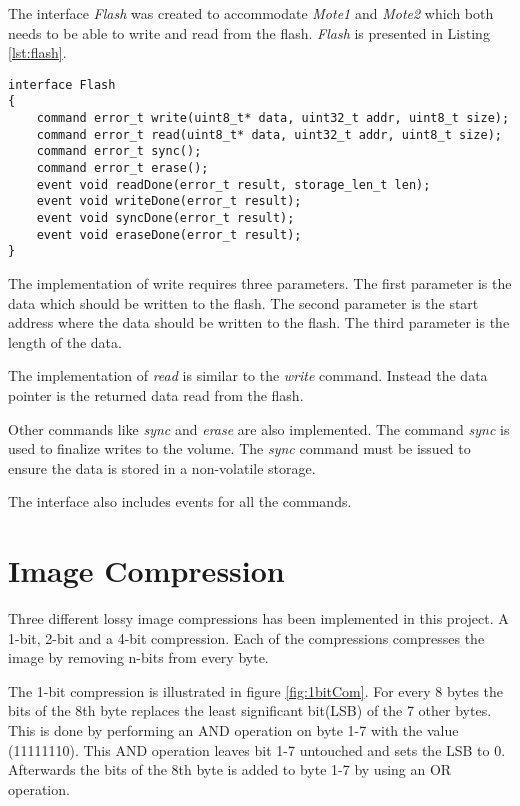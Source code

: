 The interface \emph{Flash} was created to accommodate \emph{Mote1} and \emph{Mote2} which both needs to be able to write and read from the flash. \emph{Flash} is presented in Listing \ref{lst:flash}.

\begin{lstlisting}[caption={The interface flash}, label=lst:flash]
interface Flash
{
	command error_t write(uint8_t* data, uint32_t addr, uint8_t size);
	command error_t read(uint8_t* data, uint32_t addr, uint8_t size);
	command error_t sync();
	command error_t erase();
	event void readDone(error_t result, storage_len_t len);
	event void writeDone(error_t result);
	event void syncDone(error_t result);
	event void eraseDone(error_t result);	
}
\end{lstlisting}

The implementation of write requires three parameters. The first parameter is the data which should be written to the flash. The second parameter is the start address where the data should be written to the flash. The third parameter is the length of the data. 

The implementation of \emph{read} is similar to the \emph{write} command. Instead the data pointer is the returned data read from the flash.

Other commands like \emph{sync} and \emph{erase} are also implemented. The command \emph{sync} is used to finalize writes to the volume. The \emph{sync} command must be issued to ensure the data is stored in a non-volatile storage. 

The interface also includes events for all the commands. 

\section{Image Compression}
Three different lossy image compressions has been implemented in this project. A 1-bit, 2-bit and a 4-bit compression. Each of the compressions compresses the image by removing n-bits from every byte. 

The 1-bit compression is illustrated in figure \ref{fig:1bitCom}. For every 8 bytes the bits of the 8th byte replaces the least significant bit(LSB) of the 7 other bytes. This is done by performing an AND operation on byte 1-7 with the value (11111110). This AND operation leaves bit 1-7 untouched and sets the LSB to 0.  Afterwards the bits of the 8th byte is added to byte 1-7 by using an OR operation.

\FloatBarrier

